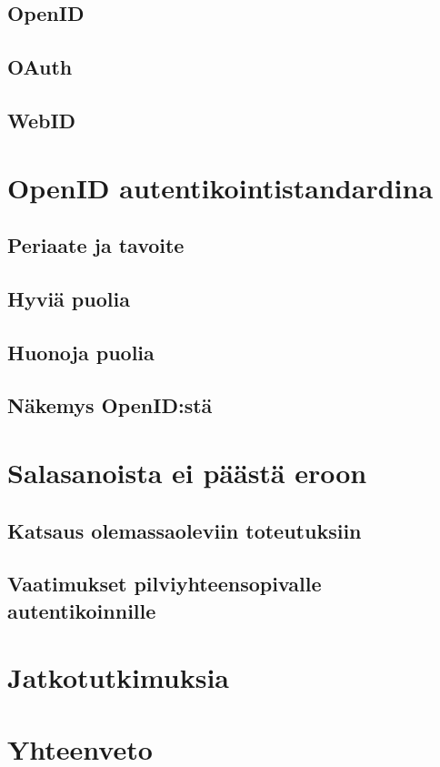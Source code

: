 \documentclass{tktltiki}
\begin{document}
\subsection{OpenID}
\subsection{OAuth}
\subsection{WebID}

\section{OpenID autentikointistandardina}
\subsection{Periaate ja tavoite}
\subsection{Hyviä puolia}
\subsection{Huonoja puolia}
\subsection{Näkemys OpenID:stä}

\section{Salasanoista ei päästä eroon}
\subsection{Katsaus olemassaoleviin toteutuksiin}
\subsection{Vaatimukset pilviyhteensopivalle autentikoinnille}

\section{Jatkotutkimuksia}
\section{Yhteenveto}





\lastpage
\end{document}

